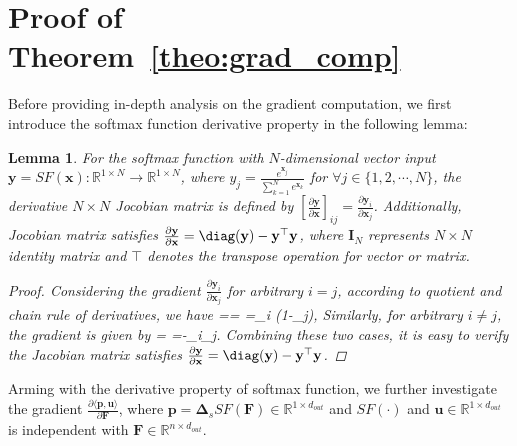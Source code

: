 \documentclass[letterpaper]{article} %
\theoremstyle{plain}
\newtheorem{lemma}[theorem]{Lemma}
\theoremstyle{definition}
\theoremstyle{remark}
\begin{document}
\section{Proof of Theorem~\ref{theo:grad_comp}}
Before providing in-depth analysis on the gradient computation, we first introduce the softmax function derivative property in the following lemma:
\begin{lemma}\label{lemma:softmax}
For the softmax function with $N$-dimensional vector input $\mathbf{y}=SF(\mathbf{x}):\mathbb{R}^{1\times N} \longrightarrow\mathbb{R}^{1\times N}$, where $y_j=\frac{e^{\mathbf{x}_j}}{\sum_{k=1}^{N}e^{\mathbf{x}_k}}$ for $\forall j\in \{1,2,\cdots, N\}$, the derivative $N\times N$ Jocobian matrix is defined by $[\frac{\partial \mathbf{y}}{\partial \mathbf{x}}]_{ij}=\frac{\partial \mathbf{y}_i}{\partial \mathbf{x}_j}$. Additionally, Jocobian matrix satisfies $\frac{\partial \mathbf{y}}{\partial \mathbf{x}}=\diag(\mathbf{y})-\mathbf{y}^{\top}\mathbf{y}$, where $\mathbf{I}_{N}$ represents $N\times N$ identity matrix and $\top$ denotes the transpose operation for vector or matrix.
\begin{proof}
Considering the gradient $\frac{\partial \mathbf{y}_i}{\partial \mathbf{x}_j}$ for arbitrary $i=j$, according to quotient and chain rule of derivatives, we have
\be
{}== \cdot {}=_i (1-_j),
\ee
Similarly, for arbitrary $i\neq j$, the gradient is given by
\be
{}= \cdot {}=-_i_j.
\ee
Combining these two cases, it is easy to verify the Jacobian matrix satisfies $\frac{\partial \mathbf{y}}{\partial \mathbf{x}}=\diag(\mathbf{y})-\mathbf{y}^{\top}\mathbf{y}$.
\end{proof}
\end{lemma}
Arming with the derivative property of softmax function, we further investigate the gradient $\frac{\partial \langle \mathbf{p}, \mathbf{u}\rangle}{\partial \mathbf{F}}$, where $\mathbf{p}=\mathbf{\Delta}_s SF(\mathbf{F})\in \mathbb{R}^{1\times d_{out}}$ and $SF(\cdot)$ and $\mathbf{u}\in \mathbb{R}^{1\times d_{out}}$ is independent with $\mathbf{F}\in \mathbb{R}^{n\times d_{out}}$.
\end{document}
